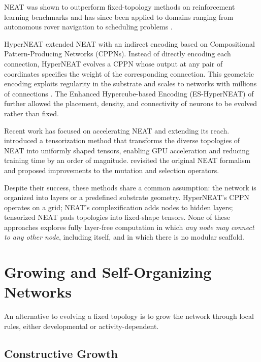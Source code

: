 NEAT was shown to outperform fixed-topology methods on reinforcement
learning benchmarks \citep{stanley2002efficient} and has since been
applied to domains ranging from autonomous rover navigation
\citep{shrestha2025reinforced} to scheduling problems
\citep{neat2024scheduling}.

HyperNEAT \citep{stanley2009hypercube} extended NEAT with an indirect
encoding based on Compositional Pattern-Producing Networks (CPPNs).
Instead of directly encoding each connection, HyperNEAT evolves a CPPN
whose output at any pair of coordinates specifies the weight of the
corresponding connection. This geometric encoding exploits regularity in
the substrate and scales to networks with millions of connections
\citep{clune2011performance}. The Enhanced Hypercube-based Encoding
(ES-HyperNEAT) of \citet{risi2012enhanced} further allowed the placement,
density, and connectivity of neurons to be evolved rather than fixed.

Recent work has focused on accelerating NEAT and extending its reach.
\citet{wang2024tensorized} introduced a tensorization method that
transforms the diverse topologies of NEAT into uniformly shaped tensors,
enabling GPU acceleration and reducing training time by an order of
magnitude. \citet{lyubchev2025revisiting} revisited the original NEAT
formalism and proposed improvements to the mutation and selection
operators.

Despite their success, these methods share a common assumption: the
network is organized into layers or a predefined substrate geometry.
HyperNEAT's CPPN operates on a grid; NEAT's complexification adds nodes
to hidden layers; tensorized NEAT pads topologies into fixed-shape
tensors. None of these approaches explores fully layer-free computation
in which \emph{any node may connect to any other node}, including
itself, and in which there is no modular scaffold.

\section{Growing and Self-Organizing Networks}
\label{sec:related-growing}

An alternative to evolving a fixed topology is to grow the network
through local rules, either developmental or activity-dependent.

\subsection{Constructive Growth}

